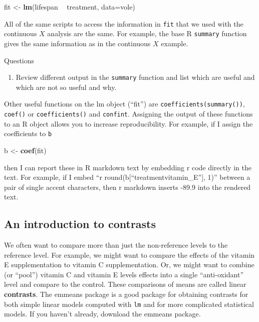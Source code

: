 \documentclass[]{book}
\newenvironment{Shaded}{\begin{snugshade}}{\end{snugshade}}
\newcommand{\KeywordTok}[1]{\textcolor[rgb]{0.13,0.29,0.53}{\textbf{#1}}}
\newcommand{\DataTypeTok}[1]{\textcolor[rgb]{0.13,0.29,0.53}{#1}}
\newcommand{\StringTok}[1]{\textcolor[rgb]{0.31,0.60,0.02}{#1}}
\newcommand{\OperatorTok}[1]{\textcolor[rgb]{0.81,0.36,0.00}{\textbf{#1}}}
\newcommand{\NormalTok}[1]{#1}
\providecommand{\tightlist}{%
  \setlength{\itemsep}{0pt}\setlength{\parskip}{0pt}}
\theoremstyle{definition}
\theoremstyle{definition}
\theoremstyle{definition}
\theoremstyle{remark}
\begin{document}
\begin{Shaded}
\begin{Highlighting}[]
\NormalTok{fit <-}\StringTok{ }\KeywordTok{lm}\NormalTok{(lifespan }\OperatorTok{~}\StringTok{ }\NormalTok{treatment, }\DataTypeTok{data=}\NormalTok{vole)}
\end{Highlighting}
\end{Shaded}

All of the same scripts to access the information in \texttt{fit} that
we used with the continuous \(X\) analysis are the same. For example,
the base R \texttt{summary} function gives the same information as in
the continuous \(X\) example.

Questions

\begin{enumerate}
\def\labelenumi{\arabic{enumi}.}
\setcounter{enumi}{3}
\tightlist
\item
  Review different output in the \texttt{summary} function and list
  which are useful and which are not so useful and why.
\end{enumerate}

Other useful functions on the lm object (``fit'') are
\texttt{coefficients(summary())}, \texttt{coef()} or
\texttt{coefficients()} and \texttt{confint}. Assigning the output of
these functions to an R object allows you to increase reproducibility.
For example, if I assign the coefficients to \texttt{b}

\begin{Shaded}
\begin{Highlighting}[]
\NormalTok{b <-}\StringTok{ }\KeywordTok{coef}\NormalTok{(fit)}
\end{Highlighting}
\end{Shaded}

then I can report these in R markdown text by embedding r code directly
in the text. For example, if I embed ``r
round(b{[}``treatmentvitamin\_E''{]}, 1)'' between a pair of single
accent characters, then r markdown inserts -89.9 into the rendered text.

\subsection{An introduction to
contrasts}\label{an-introduction-to-contrasts}

We often want to compare more than just the non-reference levels to the
reference level. For example, we might want to compare the effects of
the vitamin E supplementation to vitamin C supplementation. Or, we might
want to combine (or ``pool'') vitamin C and vitamin E levels effects
into a single ``anti-oxidant'' level and compare to the control. These
comparisons of means are called linear \textbf{contrasts}. The emmeans
package is a good package for obtaining contrasts for both simple linear
models computed with \texttt{lm} and for more complicated statistical
models. If you haven't already, download the emmeans package.
\end{document}
